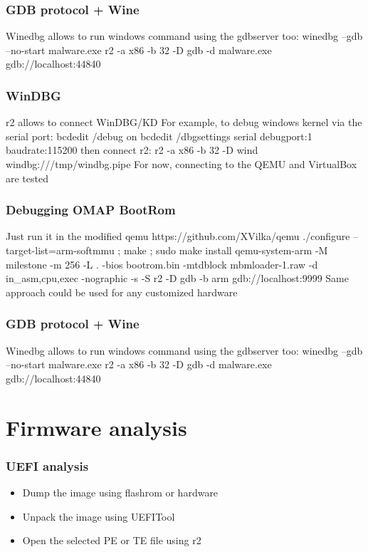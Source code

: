 \documentclass[10pt, compress]{beamer}
\begin{document}
\begin{frame}[fragile]
  \frametitle{GDB protocol + Wine}
  \center Winedbg allows to run windows command
  \center using the gdbserver too:
  \center winedbg --gdb --no-start malware.exe
  \center r2 -a x86 -b 32 -D gdb -d malware.exe gdb://localhost:44840
\end{frame}

\begin{frame}[fragile]
  \frametitle{WinDBG}
  \center r2 allows to connect WinDBG/KD
  \center For example, to debug windows kernel via the serial port:
  \center bcdedit /debug on
  \center bcdedit /dbgsettings serial debugport:1 baudrate:115200
  \center then connect r2:
  \center r2 -a x86 -b 32 -D wind windbg:///tmp/windbg.pipe
  \center For now, connecting to the QEMU and VirtualBox are tested
\end{frame}

\begin{frame}[fragile]
  \frametitle{Debugging OMAP BootRom}
  \center Just run it in the modified qemu https://github.com/XVilka/qemu
  \center ./configure --target-list=arm-softmmu ; make ; sudo make install
  \center qemu-system-arm -M milestone -m 256 -L . -bios bootrom.bin -mtdblock	mbmloader-1.raw -d in\_asm,cpu,exec -nographic -s -S
  \center r2 -D gdb -b arm gdb://localhost:9999
  \center Same approach could be used for any customized hardware
\end{frame}


\begin{frame}[fragile]
  \frametitle{GDB protocol + Wine}
  \center Winedbg allows to run windows command
  \center using the gdbserver too:
  \center winedbg --gdb --no-start malware.exe
  \center r2 -a x86 -b 32 -D gdb -d malware.exe gdb://localhost:44840
\end{frame}

\section{Firmware analysis}
\begin{frame}[fragile]
  \frametitle{UEFI analysis}
  \begin{itemize}
    \item Dump the image using flashrom or hardware
	\item Unpack the image using UEFITool
	\item Open the selected PE or TE file using r2
  \end{itemize}
\end{frame}
\end{document}
